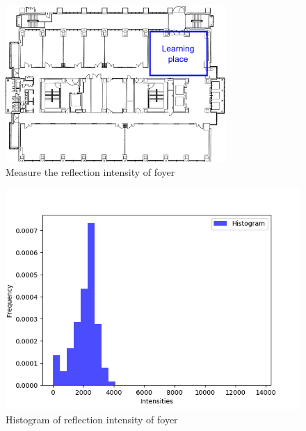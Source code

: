   \begin{figure}[h]
    \centering
    \includegraphics[keepaspectratio, scale=0.50] {images/RobotGuidance_exp3_foyer.png}
    \captionsetup{justification=raggedright} %
    \caption{Measure the reflection intensity of foyer}
    \label{Fig:RobotGuidance_exp3_foyer}
  \end{figure}

  \begin{figure}[h]
    \centering
    \includegraphics[keepaspectratio, scale=0.50] {images/RobotGuidance_plot_reflection_intensities_of_foyer.png}
    \captionsetup{justification=raggedright} %
    \caption{Histogram of reflection intensity of foyer}
    \label{Fig:Histogram of reflection intensity of foyer}
  \end{figure}

\newpage


